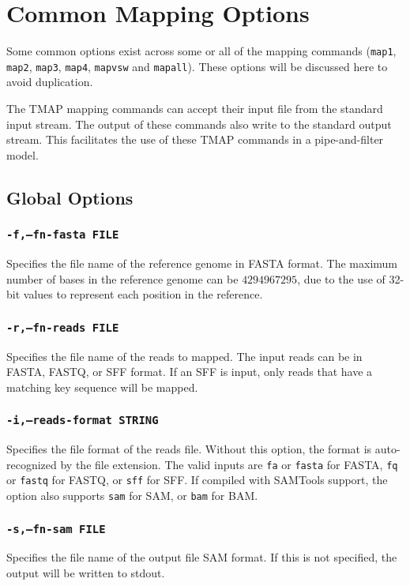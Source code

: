 \documentclass[a4paper,12pt]{book}
\newcommand{\TT}[1]{{\tt #1}} %
\begin{document}
\section{Common Mapping Options}
\label{sec:commonoptions}
Some common options exist across some or all of the mapping commands (\TT{map1}, \TT{map2}, \TT{map3}, \TT{map4}, \TT{mapvsw} and \TT{mapall}). 
These options will be discussed here to avoid duplication.

The TMAP mapping commands can accept their input file from the standard input stream.
The output of these commands also write to the standard output stream.
This facilitates the use of these TMAP commands in a pipe-and-filter model.

\subsection{Global Options}
\subsubsection{\TT{-f,--fn-fasta FILE}}
Specifies the file name of the reference genome in FASTA format.
The maximum number of bases in the reference genome can be $4294967295$, due to the use of 32-bit values to represent each position in the reference.

\subsubsection{\TT{-r,--fn-reads FILE}}
Specifies the file name of the reads to mapped.
The input reads can be in FASTA, FASTQ, or SFF format.
If an SFF is input, only reads that have a matching key sequence will be mapped.

\subsubsection{\TT{-i,--reads-format STRING}}
Specifies the file format of the reads file.
Without this option, the format is auto-recognized by the file extension.
The valid inputs are \TT{fa} or \TT{fasta} for FASTA, \TT {fq} or \TT{fastq} for FASTQ, or \TT{sff} for SFF.
If compiled with SAMTools support, the option also supports \TT{sam} for SAM, or \TT{bam} for BAM.

\subsubsection{\TT{-s,--fn-sam FILE}}
Specifies the file name of the output file SAM format.
If this is not specified, the output will be written to stdout.
\end{document}
